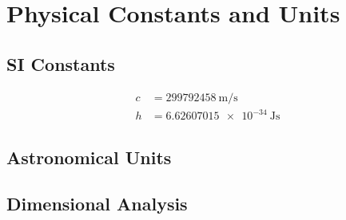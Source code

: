 \chapter{Physical Constants and Units}

\section{SI Constants}
\begin{align}
c &= \SI{299792458}{\metre\per\second}\\
h &= \SI{6.62607015e-34}{\joule\second}
\end{align}

\section{Astronomical Units}
\TODO

\section{Dimensional Analysis}
\TODO
